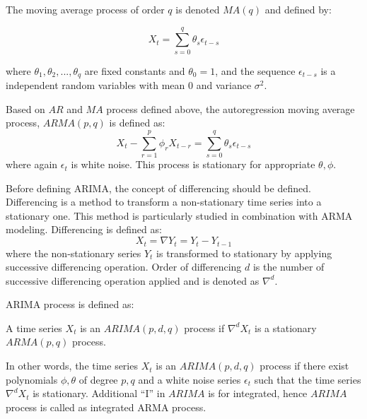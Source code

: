 The moving average process of order \(q\) is denoted \(MA(q)\) and defined by\cite{timeseriesdefinition}:

\begin{equation}
  X_{t} = \sum_{s=0}^{q} \theta_{s} \epsilon_{t-s}
\end{equation}

where \(\theta_{1},\theta_{2},...,\theta_{q}\) are fixed constants and \(\theta_{0}=1\), and the sequence \(\epsilon_{t-s}\) is a independent random variables with mean 0 and variance \(\sigma^2\).

Based on $AR$ and $MA$ process defined above, the autoregression moving average process, \(ARMA(p,q)\) is defined as\cite{timeseriesdefinition}:
\begin{equation}
  X_{t} -  \sum_{r=1}^{p} \phi_{r} X_{t-r} = \sum_{s=0}^{q} \theta_{s} \epsilon_{t-s}
\end{equation}
where again $\epsilon_{t} $ is white noise\cite{timeseriesdefinition}. This process is stationary for appropriate $\theta,\phi$.

Before defining ARIMA, the concept of differencing should be defined. Differencing is a method to transform a non-stationary time series into a stationary one. This method is particularly studied in combination with ARMA modeling. Differencing is defined as\cite{timeseriesdefinition}:
\begin{equation}
  X_{t} = \nabla Y_{t} = Y_{t} - Y_{t-1}
\end{equation}
where the non-stationary series $Y_{t}$ is transformed to stationary by applying successive differencing operation. Order of differencing $d$ is the number of successive differencing operation applied and is denoted as $\nabla^d$\cite{timeseriesdefinition}.

ARIMA process is defined as\cite{timeseriesdefinition}:
\begin{definition}{}
A time series $X_{t}$ is an $ARIMA(p,d,q)$ process if $\nabla^d X_{t}$ is a stationary $ARMA(p,q)$ process.
\end{definition}

In other words, the time series $X_{t}$ is an $ARIMA(p,d,q)$ process if there exist polynomials $\phi,\theta$ of degree $p,q$ and a white noise series $\epsilon_{t}$ such that the time series $\nabla^d X_{t}$ is stationary\cite{timeseriesdefinition}. Additional ``I'' in $ARIMA$ is for integrated, hence $ARIMA$ process is called as integrated ARMA process.

